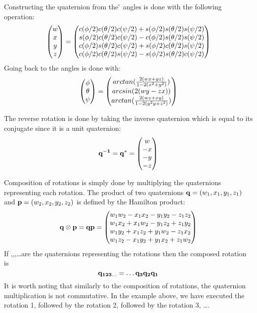 Constructing the quaternion from the \v{\theta} angles is done with the
following operation:
\begin{equation}
	\begin{pmatrix}w\\x\\y\\z\end{pmatrix} = \begin{pmatrix}
		c(\phi/2)c(\theta/2)c(\psi/2)+s(\phi/2)s(\theta/2)s(\psi/2)\\
		s(\phi/2)c(\theta/2)c(\psi/2)-c(\phi/2)s(\theta/2)s(\psi/2)\\
		c(\phi/2)s(\theta/2)c(\psi/2)+s(\phi/2)c(\theta/2)s(\psi/2)\\
		c(\phi/2)c(\theta/2)s(\psi/2)-s(\phi/2)s(\theta/2)c(\psi/2)
	\end{pmatrix}
\end{equation}
 Going back to the angles is done with:
 \begin{equation}
	\begin{pmatrix}\phi\\\theta\\\psi\end{pmatrix} = \begin{pmatrix}
		arctan(\frac{2(wx + yz)}{1-2(x^2 + y^2)})\\
		arcsin(2(wy - zx))\\
		arctan(\frac{2(wz + xy)}{1-2(y^2y + z^2)})
	\end{pmatrix}
\end{equation}

The reverse rotation is done by taking the inverse quaternion which is equal to
its conjugate since it is a unit quaternion:
\begin{equation}
	\mathbf{q^{-1}} = \mathbf{q^{*}} = \begin{pmatrix}w\\-x\\-y\\-z\end{pmatrix} 
\end{equation}

Composition of rotations is simply done by multiplying the quaternions
representing each rotation. The product of two quaternions $\mathbf{q} =
(w_1,x_1,y_1,z_1)$ and $\mathbf{p} = (w_2,x_2,y_2,z_2)$ is defined by the Hamilton
product:
\begin{equation}
	\mathbf{q}\otimes\mathbf{p} = \mathbf{q}\mathbf{p} = \begin{pmatrix}
	w_1w_2 - x_1x_2 - y_1y_2 - z_1z_2\\
	w_1x_2 + x_1w_2 - y_1z_2 + z_1y_2\\
	w_1y_2 + x_1z_2 + y_1w_2 - z_1x_2\\
	w_1z_2 - x_1y_2 + y_1x_2 + z_1w_2
	\end{pmatrix}
\end{equation}
If ,,,\ldots are the quaternions representing the
rotations then the composed rotation  is
\begin{equation}
	\mathbf{q_{123\ldots}} = \ldots\mathbf{q_3}\mathbf{q_2}\mathbf{q_1}
\end{equation}
It is worth noting that similarly to the composition of rotations, the
quaternion multiplication is not commutative. In the example above, we have
executed the rotation 1, followed by the rotation 2, followed by the rotation 3,
\ldots.

